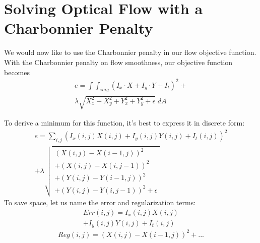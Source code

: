 \documentclass[10pt,twocolumn,letterpaper]{article}
\begin{document}
\section{Solving Optical Flow with a Charbonnier Penalty}

We would now like to use the Charbonnier penalty in our flow objective function.  With the Charbonnier penalty on flow smoothness, our objective function becomes
\begin{multline} \label{eq:objectivec}
e = \int \int_{img} (I_x \cdot X + I_y \cdot Y + I_t)^2 + \\
\lambda \sqrt{X_x^2 + X_y^2 + Y_x^2 + Y_y^2 + \epsilon} \; dA 
\end{multline}

To derive a minimum for this function, it's best to express it in discrete form:
\begin{multline} \label{eq:objectivecDiscrete}
e = \sum_{i,j} (I_x(i, j) X(i, j) + I_y(i, j) Y(i, j) + I_t(i, j))^2 \\
+ \lambda \sqrt{
\begin{array}{c}
(X(i, j) - X(i-1, j))^2 \\
+ (X(i,j) - X(i,j-1))^2 \\
+ (Y(i,j) - Y(i-1, j))^2 \\
+ (Y(i,j) - Y(i,j-1))^2 + \epsilon
\end{array}
}
\end{multline}
To save space, let us name the error and regularization terms:
\begin{multline} \label{eq:errorTerm}
Err(i, j) = I_x(i, j) X(i, j) \\
+ I_y(i, j) Y(i, j) + I_t(i, j)
\end{multline}
\begin{equation} \label{eq:regTerm}
Reg(i,j) = (X(i,j) - X(i-1,j))^2 + ...
\end{equation}
\end{document}
